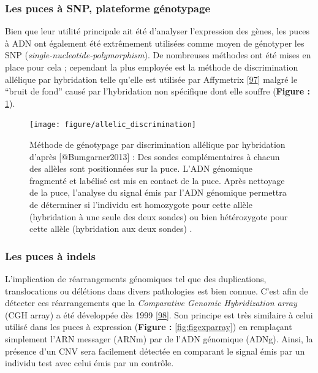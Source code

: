 \documentclass[12pt,twoside]{ugathesis}
\theoremstyle{definition}
\theoremstyle{definition}
\theoremstyle{remark}
\begin{document}
\newpage

\subsubsection{Les puces à SNP, plateforme
génotypage}\label{les-puces-a-snp-plateforme-genotypage}

Bien que leur utilité principale ait été d'analyser l'expression des
gènes, les puces à ADN ont également été extrêmement utilisées comme
moyen de génotyper les SNP (\emph{single-nucleotide-polymorphism}). De
nombreuses méthodes ont été mises en place pour cela ; cependant la plus
employée est la méthode de discrimination allélique par hybridation
telle qu'elle est utilisée par Affymetrix
{[}\protect\hyperlink{ref-Wang1998}{97}{]} malgré le ``bruit de fond''
causé par l'hybridation non spécifique dont elle souffre (\textbf{Figure
:} \ref{fig:figallelicdisc}).

\begin{figure}

{\centering \texttt{[image: figure/allelic\_discrimination]} 

}

\caption[Méthode de génotypage par discrimination allélique par hybridation]{Méthode de génotypage par discrimination allélique par hybridation d'après [@Bumgarner2013] : Des sondes complémentaires à chacun des allèles sont positionnées sur la puce. L'ADN génomique fragmenté et labélisé est mis en contact de la puce. Après nettoyage de la puce, l'analyse du signal émis par l'ADN génomique permettra de déterminer si l'individu est homozygote pour cette allèle (hybridation à une seule des deux sondes) ou bien hétérozygote pour cette allèle (hybridation aux deux sondes) .}\label{fig:figallelicdisc}
\end{figure}

\newpage

\subsubsection{Les puces à indels}\label{les-puces-a-indels}

L'implication de réarrangements génomiques tel que des duplications,
translocations ou délétions dans divers pathologies est bien connue.
C'est afin de détecter ces réarrangements que la \emph{Comparative
Genomic Hybridization array} (CGH array) a été développée dès 1999
{[}\protect\hyperlink{ref-Brown1999}{98}{]}. Son principe est très
similaire à celui utilisé dans les puces à expression (\textbf{Figure :}
\ref{fig:figexparray}) en remplaçant simplement l'ARN messager (ARNm)
par de l'ADN génomique (ADNg). Ainsi, la présence d'un CNV sera
facilement détectée en comparant le signal émis par un individu test
avec celui émis par un contrôle.
\end{document}
